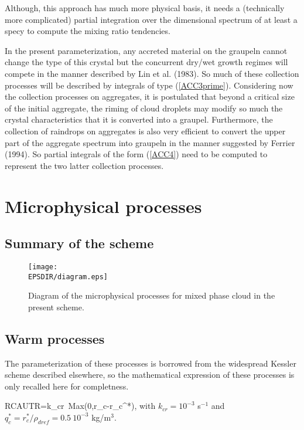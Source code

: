 Although, this approach has much more physical basis, it needs a (technically
more complicated) partial integration over the dimensional spectrum of at least
a specy to compute the mixing ratio tendencies.

In the present parameterization, any accreted material on the graupeln cannot
change the type of this crystal but the concurrent dry/wet growth regimes will
compete in the manner described by Lin et al. (1983). So much of these
collection processes will be described by integrals of type (\ref{ACC3prime}).
Considering now the collection processes on aggregates, it is postulated that
beyond a critical size of the initial aggregate, the riming of cloud droplets
may modify so much the crystal characteristics that it is converted into a
graupel. Furthermore, the collection of raindrops on aggregates is also very
efficient to convert the upper part of the aggregate spectrum into graupeln in
the manner suggested by Ferrier (1994). So partial integrals of the form
(\ref{ACC4}) need to be computed to represent the two latter collection processes.

\newpage
%
\section{Microphysical processes}
%
%
\subsection{Summary of the scheme}
%
\begin{figure}[!ht]
\centerline{\texttt{[image: \\EPSDIR/diagram.eps]}}
\caption{Diagram of the microphysical processes for mixed phase cloud in the present scheme.}
\label{mixfigdiagram}
\end{figure}

%
\subsection{Warm processes}
%
The parameterization of these processes is borrowed from the widespread Kessler
scheme described elsewhere, so the mathematical expression of these processes is
only recalled here for completness.

%
\be\label{WARM1}
RCAUTR=k_{cr}\ Max(0,r_c-r_c^*),
\ee
%
\noindent with $k_{cr}=10^{-3}$ s$^{-1}$ and
$q_c^*=r_c^*/\rho_{dref}=0.5\ 10^{-3}$ kg/m$^3$.

